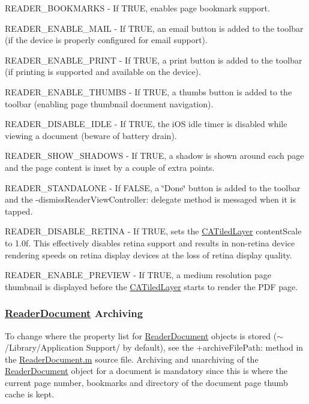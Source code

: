 {\ttfamily R\-E\-A\-D\-E\-R\-\_\-\-B\-O\-O\-K\-M\-A\-R\-K\-S} -\/ If T\-R\-U\-E, enables page bookmark support.

{\ttfamily R\-E\-A\-D\-E\-R\-\_\-\-E\-N\-A\-B\-L\-E\-\_\-\-M\-A\-I\-L} -\/ If T\-R\-U\-E, an email button is added to the toolbar (if the device is properly configured for email support).

{\ttfamily R\-E\-A\-D\-E\-R\-\_\-\-E\-N\-A\-B\-L\-E\-\_\-\-P\-R\-I\-N\-T} -\/ If T\-R\-U\-E, a print button is added to the toolbar (if printing is supported and available on the device).

{\ttfamily R\-E\-A\-D\-E\-R\-\_\-\-E\-N\-A\-B\-L\-E\-\_\-\-T\-H\-U\-M\-B\-S} -\/ If T\-R\-U\-E, a thumbs button is added to the toolbar (enabling page thumbnail document navigation).

{\ttfamily R\-E\-A\-D\-E\-R\-\_\-\-D\-I\-S\-A\-B\-L\-E\-\_\-\-I\-D\-L\-E} -\/ If T\-R\-U\-E, the i\-O\-S idle timer is disabled while viewing a document (beware of battery drain).

{\ttfamily R\-E\-A\-D\-E\-R\-\_\-\-S\-H\-O\-W\-\_\-\-S\-H\-A\-D\-O\-W\-S} -\/ If T\-R\-U\-E, a shadow is shown around each page and the page content is inset by a couple of extra points.

{\ttfamily R\-E\-A\-D\-E\-R\-\_\-\-S\-T\-A\-N\-D\-A\-L\-O\-N\-E} -\/ If F\-A\-L\-S\-E, a \char`\"{}\-Done\char`\"{} button is added to the toolbar and the -\/dismiss\-Reader\-View\-Controller\-: delegate method is messaged when it is tapped.

{\ttfamily R\-E\-A\-D\-E\-R\-\_\-\-D\-I\-S\-A\-B\-L\-E\-\_\-\-R\-E\-T\-I\-N\-A} -\/ If T\-R\-U\-E, sets the \hyperlink{class_c_a_tiled_layer}{C\-A\-Tiled\-Layer} content\-Scale to 1.\-0f. This effectively disables retina support and results in non-\/retina device rendering speeds on retina display devices at the loss of retina display quality.

{\ttfamily R\-E\-A\-D\-E\-R\-\_\-\-E\-N\-A\-B\-L\-E\-\_\-\-P\-R\-E\-V\-I\-E\-W} -\/ If T\-R\-U\-E, a medium resolution page thumbnail is displayed before the \hyperlink{class_c_a_tiled_layer}{C\-A\-Tiled\-Layer} starts to render the P\-D\-F page.

\subsubsection*{\hyperlink{interface_reader_document}{Reader\-Document} Archiving}

To change where the property list for \hyperlink{interface_reader_document}{Reader\-Document} objects is stored ($\sim$/\-Library/\-Application Support/ by default), see the +archive\-File\-Path\-: method in the \hyperlink{_reader_document_8m}{Reader\-Document.\-m} source file. Archiving and unarchiving of the \hyperlink{interface_reader_document}{Reader\-Document} object for a document is mandatory since this is where the current page number, bookmarks and directory of the document page thumb cache is kept.

